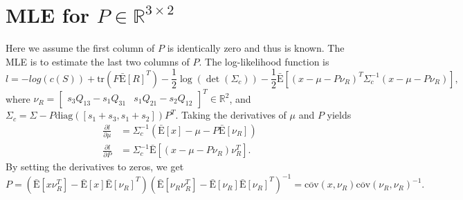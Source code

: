 \documentclass[10pt]{article}
\newcommand{\tr}[1]{\ensuremath{\mathrm{tr}\left( #1 \right)}}
\newcommand{\expectbar}[1]{\ensuremath{\bar{\mathrm{E}}\left[ #1 \right]}}
\newcommand{\real}[1]{\ensuremath{\mathbb{R}^{ #1 }}}
\begin{document}
\section{MLE for $P\in\real{3 \times 2}$}

Here we assume the first column of $P$ is identically zero and thus is known.
The MLE is to estimate the last two columns of $P$.
The log-likelihood function is
\begin{equation*}
	l = -log(c(S)) + \tr{F\expectbar{R}^T} - \frac{1}{2}\log(\det(\Sigma_c)) - \frac{1}{2}\expectbar{(x-\mu-P\nu_R)^T\Sigma_c^{-1}(x-\mu-P\nu_R)},
\end{equation*}
where $\nu_R = \begin{bmatrix} s_3Q_{13}-s_1Q_{31} & s_1Q_{21}-s_2Q_{12} \end{bmatrix}^T \in \real{2}$, and $\Sigma_c = \Sigma-P\mathrm{diag}([s_1+s_3,s_1+s_2])P^T$.
Taking the derivatives of $\mu$ and $P$ yields
\begin{align*}
	\frac{\partial l}{\partial \mu} &= \Sigma_c^{-1}(\expectbar{x}-\mu-P\expectbar{\nu_R}) \\
	\frac{\partial l}{\partial P} &= \Sigma_c^{-1}\expectbar{(x-\mu-P\nu_R)\nu_R^T}.
\end{align*}
By setting the derivatives to zeros, we get
\begin{equation*}
	P = \left( \expectbar{x\nu_R^T}-\expectbar{x}\expectbar{\nu_R}^T \right) \left( \expectbar{\nu_R\nu_R^T}-\expectbar{\nu_R}\expectbar{\nu_R}^T \right)^{-1} = \overline{\mathrm{cov}}(x,\nu_R) \overline{\mathrm{cov}}(\nu_R,\nu_R)^{-1}.
\end{equation*}
\end{document}
